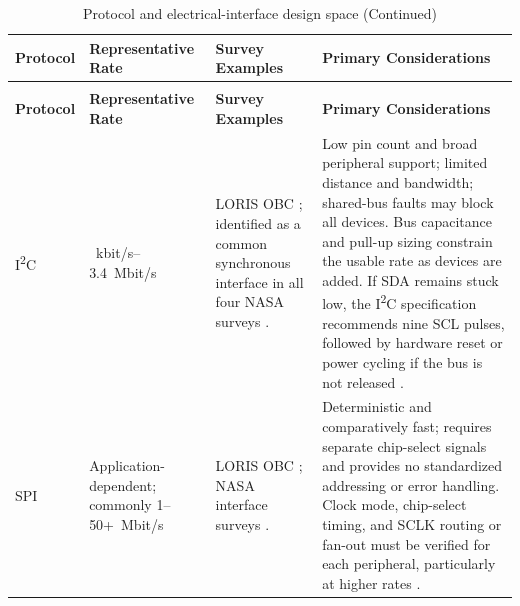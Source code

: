\documentclass[10pt]{../datasheet}
\let\cite\citep
\begin{document}
\renewcommand{\arraystretch}{1.15}
\begin{longtable}{|
  >{\raggedright\arraybackslash}p{2.5cm}|
  >{\raggedright\arraybackslash}p{2.5cm}|
  >{\raggedright\arraybackslash}p{5.0cm}|
  >{\raggedright\arraybackslash}p{5.2cm}|}
  \caption{Protocol and electrical-interface design space} \label{tab:protocol_design_space} \\ \hline
  \textbf{Protocol}                                                    &
  \textbf{Representative Rate}                                         &
  \textbf{Survey Examples}                                             &
  \textbf{Primary Considerations}                                                            \\ \hline
  \endfirsthead
  \caption[]{Protocol and electrical-interface design space (Continued)}                     \\ \hline
  \textbf{Protocol}                                                    &
  \textbf{Representative Rate}                                         &
  \textbf{Survey Examples}                                             &
  \textbf{Primary Considerations}                                                            \\ \hline
  \endhead
  \hline
  \endfoot

  I\textsuperscript{2}C                                                &
  100~kbit/s--3.4~Mbit/s                                               &
  LORIS OBC \cite{loris_obc_pub}; identified as a common synchronous interface
  in all four NASA surveys
  \cite[p.~219]{nasa_soa_2022}
  \cite[p.~235]{nasa_soa_2023}
  \cite[p.~240]{nasa_soa_2024}
  \cite[p.~224]{nasa_soa_2026}.                                        &
  Low pin count and broad peripheral support; limited distance and bandwidth;
  shared-bus faults may block all devices. Bus capacitance and pull-up sizing
  constrain the usable rate as devices are added. If SDA remains stuck low, the
  I\textsuperscript{2}C specification recommends nine SCL pulses, followed by
  hardware reset or power cycling if the bus is not released
  \cite{nxp_um10204}.                                                                        \\ \hline

  SPI                                                                  &
  Application-dependent; commonly 1--50+~Mbit/s                        &
  LORIS OBC \cite{loris_obc_pub}; NASA interface surveys
  \cite[p.~219]{nasa_soa_2022}
  \cite[p.~235]{nasa_soa_2023}
  \cite[p.~240]{nasa_soa_2024}
  \cite[p.~224]{nasa_soa_2026}.                                        &
  Deterministic and comparatively fast; requires separate chip-select signals
  and provides no standardized addressing or error handling. Clock mode,
  chip-select timing, and SCLK routing or fan-out must be verified for each
  peripheral, particularly at higher rates \cite{adi_spi_errors}.                            \\ \hline


\end{longtable}
\end{document}
